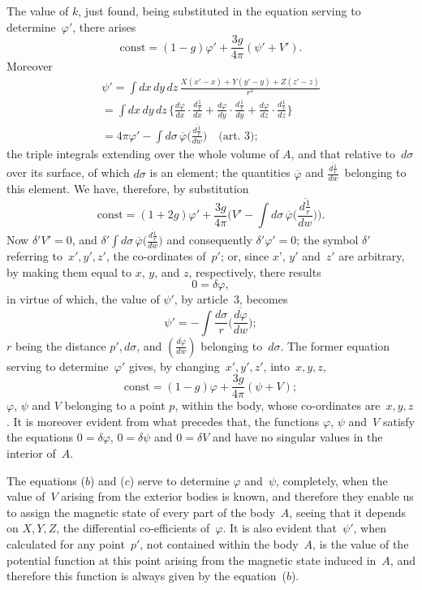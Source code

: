 \documentclass[12pt,notitlepage]{amsart}
\renewcommand{\phi}{\varphi}
\begin{document}
The value of $k$, just found, being substituted in the equation serving
to determine~$\phi'$, there arises
\[
\text{const}=(1-g)\phi'+\frac{3g}{4\pi}(\psi'+V').
\]
Moreover
\begin{multline*}
\psi'=\int dx\,dy\,dz\,\frac{X(x'-x)+Y(y'-y)+Z(z'-z)}{r^3}\\
=\int dx\,dy\,dz\,\biggl\{
  \frac{d\phi}{dx}\cdot\frac{d\frac1r}{dx}
  +\frac{d\phi}{dy}\cdot\frac{d\frac1r}{dy}
  +\frac{d\phi}{dz}\cdot\frac{d\frac1r}{dz}
\biggr\}\\
=4\pi\phi'-\int d\sigma\,\overline\phi
\biggl(\frac{\overline{d\frac1r}}{dw}\biggr)
\quad\text{(art.~3)};
\end{multline*}
the triple integrals extending over the whole volume of $A$, and that relative
to~$d\sigma$ over its surface, of which $d\sigma$ is an element;
the quantities $\overline\phi$ and
$\frac{\overline{d\frac1r}}{dw}$~belonging to this element.
We have, therefore, by substitution
\[
\text{const}=(1+2g)\phi'+
\frac{3g}{4\pi}\Biggl(V'-
\int d\sigma\,\overline\phi\biggl(\frac{\overline{d\frac1r}}{dw}\biggr)\Biggr).
\]
Now $\delta'V'=0$, and
$\delta'\int d\sigma\,\overline\phi\bigl(\frac{\overline{d\frac1r}}{dw}\bigr)$
and consequently ${\delta'\phi'=0}$; the
symbol $\delta'$ referring to~$x',y',z'$,
the co-ordinates of~$p'$; or, since $x$', $y'$ and~$z'$
are arbitrary, by making them equal to $x$, $y$, and $z$,
respectively, there results
\[
0=\delta\phi,
\]
in virtue of which, the value of $\psi'$, by article~3, becomes
\[
\tag{$b$.}
\psi'=-\int\frac{d\sigma}{r}\biggl(\frac{\overline{d\phi}}{dw}\biggr);
\]
$r$ being the distance $p',d\sigma$,
and $(\frac{\overline{d\phi}}{dw})$  belonging to~$d\sigma$. The former equation
serving to determine~$\phi'$ gives, by changing~$x',y',z'$, into~$x,y,z$,
\[
\tag{$c$.}
\text{const}=(1-g)\phi+\frac{3g}{4\pi}(\psi+V);
\]
$\phi$, $\psi$ and $V$ belonging to a point $p$,
within the body, whose co-ordinates
are~$x,y,z$. It is moreover evident from what precedes that, the functions
$\phi$, $\psi$ and~$V$ satisfy the equations
$0=\delta\phi$, $0=\delta\psi$ and $0=\delta V$ and have
no singular values in the interior of~$A$.

The equations ($b$) and ($c$) serve to determine $\phi$ and~$\psi$, completely,
when the value of~$V$ arising from the exterior bodies is known, and therefore
they enable us to assign the magnetic state of every part of the body~$A$,
seeing that it depends on $X, Y, Z$, the differential co-efficients of~$\phi$.
It is
also evident that~$\psi'$, when calculated for any point~$p'$,
not contained within
the body~$A$, is the value of the potential function at this point arising from
the magnetic state induced in~$A$, and therefore this function is always given
by the equation~($b$).
\end{document}
